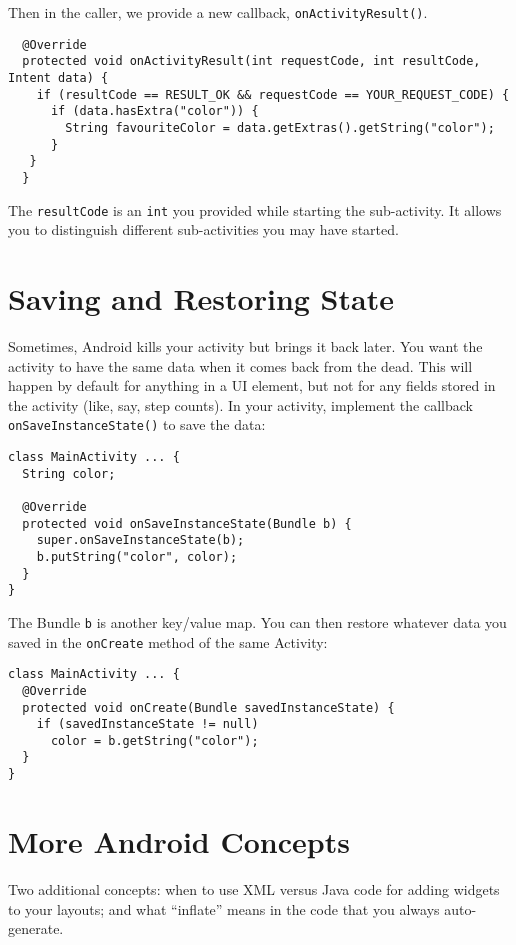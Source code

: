 Then in the caller, we provide a new callback, {\tt onActivityResult()}.

{\scriptsize
\begin{verbatim}
  @Override
  protected void onActivityResult(int requestCode, int resultCode, Intent data) {
    if (resultCode == RESULT_OK && requestCode == YOUR_REQUEST_CODE) {
      if (data.hasExtra("color")) {
        String favouriteColor = data.getExtras().getString("color");
      }
   }
  }
\end{verbatim}
}

The {\tt resultCode} is an {\tt int} you provided while starting the
sub-activity. It allows you to distinguish different sub-activities you
may have started.



\section*{Saving and Restoring State}
Sometimes, Android kills your activity but brings it back later. You
want the activity to have the same data when it comes back from the
dead. This will happen by default for anything in a UI element, but
not for any fields stored in the activity (like, say, step counts). In
your activity, implement the callback {\tt onSaveInstanceState()} to
save the data:

{\scriptsize
\begin{verbatim}
class MainActivity ... {
  String color;

  @Override
  protected void onSaveInstanceState(Bundle b) {
    super.onSaveInstanceState(b);
    b.putString("color", color);
  }
}
\end{verbatim}
}
The Bundle {\tt b} is another key/value map. You can then restore whatever
data you saved in the {\tt onCreate} method of the same Activity:
{\scriptsize
\begin{verbatim}
class MainActivity ... {
  @Override
  protected void onCreate(Bundle savedInstanceState) {
    if (savedInstanceState != null)
      color = b.getString("color");
  }
}
\end{verbatim}
}

\section*{More Android Concepts}
Two additional concepts: when to use XML versus Java
code for adding widgets to your layouts; and what ``inflate'' means
in the code that you always auto-generate.


